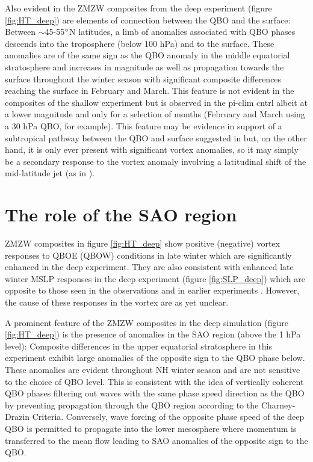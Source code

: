 Also evident in the ZMZW composites from the deep experiment (figure \ref{fig:HT_deep}) are elements of connection between the QBO and the surface: Between $\sim$45-55$\degree$N latitudes, a limb of anomalies associated with QBO phases descends into the troposphere (below 100 hPa) and to the surface. These anomalies are of the same sign as the QBO anomaly in the middle equatorial stratosphere and increases in magnitude as well as propagation towards the surface throughout the winter season with significant composite differences reaching the surface in February and March. This feature is not evident in the composites of the shallow experiment but is observed in the pi-clim cntrl albeit at a lower magnitude and only for a selection of months (February and March using a 30 hPa QBO, for example). This feature may be evidence in support of a subtropical pathway between the QBO and surface suggested in \cite{graySurface2018b} but, on the other hand, it is only ever present with significant vortex anomalies, so it may simply be a secondary response to the vortex anomaly involving a latitudinal shift of the mid-latitude jet (as in \cite{baldwinStratospheric2001a}). 

\section{The role of the SAO region}
\label{sec:role_SAO}

ZMZW composites in figure \ref{fig:HT_deep} show positive (negative) vortex responses to QBOE (QBOW) conditions in late winter which are significantly enhanced in the deep experiment. They are also consistent with enhanced late winter MSLP responses in the deep experiment (figure \ref{fig:SLP_deep}) which are opposite to those seen in the observations \cite{graySurface2018b} and in earlier experiments \cite{andrewsObserved2019d}. However, the cause of these responses in the vortex are as yet unclear. 

A prominent feature of the ZMZW composites in the deep simulation (figure \ref{fig:HT_deep}) is the presence of anomalies in the SAO region (above the 1 hPa level): Composite differences in the upper equatorial stratosphere in this experiment exhibit large anomalies of the opposite sign to the QBO phase below. These anomalies are evident throughout NH winter season and are not sensitive to the choice of QBO level. This is consistent with the idea of vertically coherent QBO phases filtering out waves with the same phase speed direction as the QBO by preventing propagation through the QBO region according to the Charney-Drazin Criteria. Conversely, wave forcing of the opposite phase speed of the deep QBO is permitted to propagate into the lower mesosphere where momentum is transferred to the mean flow leading to SAO anomalies of the opposite sign to the QBO. 


